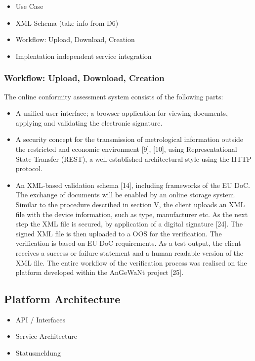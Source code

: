 \documentclass[3p,times,procedia]{elsarticle}
\begin{document}
\begin{itemize}
    \item Use Case
    \item XML Schema (take info from D6)
    \item Workflow: Upload, Download, Creation
    \item Implentation independent service integration
\end{itemize}

\subsubsection{Workflow: Upload, Download, Creation}
The online conformity assessment system consists of the following parts:
\begin{itemize}
    
\item A unified user interface; a browser application for viewing documents, applying and validating the electronic signature.
\item A security concept for the transmission of metrological information outside the restricted and economic environment [9], [10], using Representational State Transfer (REST), a well-established architectural style using the HTTP protocol.
\item An XML‐based validation schema [14], including frameworks of the EU DoC. The exchange of documents will be enabled by an online storage system. 
Similar to the procedure described in section V, the client uploads an XML file with the device information, such as type, manufacturer etc. As the next step the XML file is secured, by application of a digital signature [24]. The signed XML file is then uploaded to a OOS for the verification. The verification is based on EU DoC requirements. As a test output, the client receives a success or failure statement and a human readable version of the XML file. The entire workflow of the verification process was realised on the platform developed within the AnGeWaNt project [25].
\end{itemize}

\subsection{Platform Architecture}
\begin{itemize}
    \item API / Interfaces 
    \item Service Architecture 
    \item Statusmeldung
\end{itemize}
\end{document}

